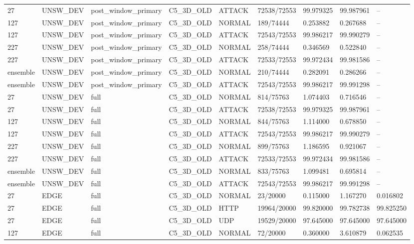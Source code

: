 \begin{tabular}{lllllllll}
27 & UNSW\_DEV & post\_window\_primary & C5\_3D\_OLD & ATTACK & 72538/72553 & 99.979325 & 99.987961 & -- \\
127 & UNSW\_DEV & post\_window\_primary & C5\_3D\_OLD & NORMAL & 189/74444 & 0.253882 & 0.267688 & -- \\
127 & UNSW\_DEV & post\_window\_primary & C5\_3D\_OLD & ATTACK & 72543/72553 & 99.986217 & 99.990279 & -- \\
227 & UNSW\_DEV & post\_window\_primary & C5\_3D\_OLD & NORMAL & 258/74444 & 0.346569 & 0.522840 & -- \\
227 & UNSW\_DEV & post\_window\_primary & C5\_3D\_OLD & ATTACK & 72533/72553 & 99.972434 & 99.981586 & -- \\
ensemble & UNSW\_DEV & post\_window\_primary & C5\_3D\_OLD & NORMAL & 210/74444 & 0.282091 & 0.286266 & -- \\
ensemble & UNSW\_DEV & post\_window\_primary & C5\_3D\_OLD & ATTACK & 72543/72553 & 99.986217 & 99.991298 & -- \\
27 & UNSW\_DEV & full & C5\_3D\_OLD & NORMAL & 814/75763 & 1.074403 & 0.716546 & -- \\
27 & UNSW\_DEV & full & C5\_3D\_OLD & ATTACK & 72538/72553 & 99.979325 & 99.987961 & -- \\
127 & UNSW\_DEV & full & C5\_3D\_OLD & NORMAL & 844/75763 & 1.114000 & 0.678850 & -- \\
127 & UNSW\_DEV & full & C5\_3D\_OLD & ATTACK & 72543/72553 & 99.986217 & 99.990279 & -- \\
227 & UNSW\_DEV & full & C5\_3D\_OLD & NORMAL & 899/75763 & 1.186595 & 0.921067 & -- \\
227 & UNSW\_DEV & full & C5\_3D\_OLD & ATTACK & 72533/72553 & 99.972434 & 99.981586 & -- \\
ensemble & UNSW\_DEV & full & C5\_3D\_OLD & NORMAL & 833/75763 & 1.099481 & 0.695814 & -- \\
ensemble & UNSW\_DEV & full & C5\_3D\_OLD & ATTACK & 72543/72553 & 99.986217 & 99.991298 & -- \\
27 & EDGE & full & C5\_3D\_OLD & NORMAL & 23/20000 & 0.115000 & 1.167270 & 0.016802 \\
27 & EDGE & full & C5\_3D\_OLD & HTTP & 19964/20000 & 99.820000 & 99.782738 & 99.825250 \\
27 & EDGE & full & C5\_3D\_OLD & UDP & 19529/20000 & 97.645000 & 97.645000 & 97.645000 \\
127 & EDGE & full & C5\_3D\_OLD & NORMAL & 72/20000 & 0.360000 & 3.610879 & 0.062535 \\

\end{tabular}
